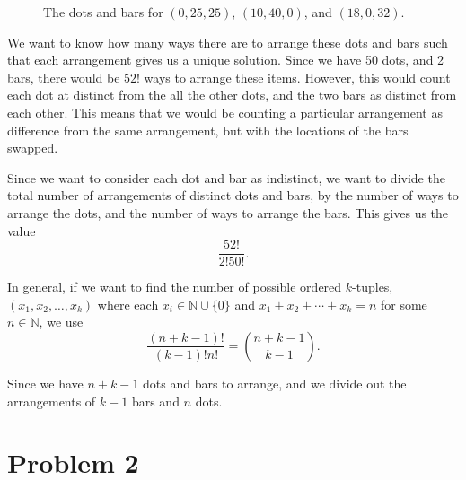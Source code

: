 \documentclass[12pt]{article}
\newcommand{\N}{\mathbb{N}}
\begin{document}
\begin{figure}[ht]
    \centering
    \caption{The dots and bars for $(0,25,25)$, $(10,40,0)$, and $(18,0,32)$.}
    \label{fig:zero-ex}
\end{figure}

\newpage
We want to know how many ways there are to arrange these dots and bars such that each arrangement gives us a unique solution. Since we have 50 dots, and 2 bars, there would be $52!$ ways to arrange these items. However, this would count each dot at distinct from the all the other dots, and the two bars as distinct from each other. This means that we would be counting a particular arrangement as difference from the same arrangement, but with the locations of the bars swapped.

Since we want to consider each dot and bar as indistinct, we want to divide the total number of arrangements of distinct dots and bars, by the number of ways to arrange the dots, and the number of ways to arrange the bars. This gives us the value
\[\frac{52!}{2!50!}.\]

In general, if we want to find the number of possible ordered $k$-tuples, $(x_1,x_2,\dots,x_k)$ where each $x_i\in\N\cup\{0\}$ and $x_1+x_2+\cdots+x_k = n$ for some $n\in\N$, we use
\[\frac{(n+k-1)!}{(k-1)!n!} = {n+k-1 \choose k-1}.\]

Since we have $n+k-1$ dots and bars to arrange, and we divide out the arrangements of $k-1$ bars and $n$ dots.


\section*{Problem 2}
\\
\end{document}
